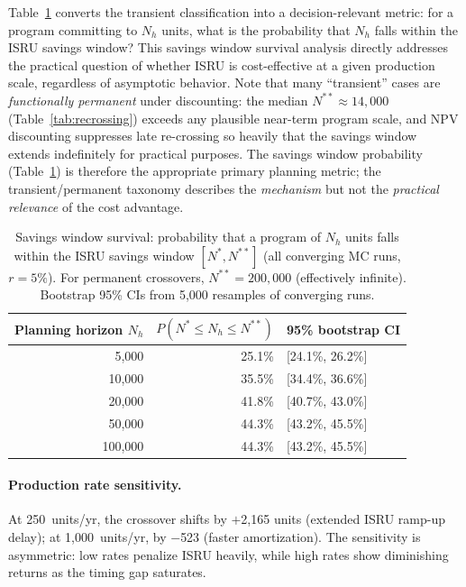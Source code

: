 \documentclass[preprint,12pt]{elsarticle}
\begin{document}
Table~\ref{tab:savings_survival} converts the transient classification into a decision-relevant metric: for a program committing to $N_h$ units, what is the probability that $N_h$ falls within the ISRU savings window? This savings window survival analysis directly addresses the practical question of whether ISRU is cost-effective at a given production scale, regardless of asymptotic behavior. Note that many ``transient'' cases are \emph{functionally permanent} under discounting: the median $N^{**} \approx 14{,}000$ (Table~\ref{tab:recrossing}) exceeds any plausible near-term program scale, and NPV discounting suppresses late re-crossing so heavily that the savings window extends indefinitely for practical purposes. The savings window probability (Table~\ref{tab:savings_survival}) is therefore the appropriate primary planning metric; the transient/permanent taxonomy describes the \emph{mechanism} but not the \emph{practical relevance} of the cost advantage.

\begin{table}[htbp]
\centering
\caption{Savings window survival: probability that a program of $N_h$ units falls within the ISRU savings window $[N^*, N^{**}]$ (all converging MC runs, $r = 5\%$). For permanent crossovers, $N^{**} = 200{,}000$ (effectively infinite). Bootstrap 95\% CIs from 5{,}000 resamples of converging runs.}
\label{tab:savings_survival}
\small
\begin{tabular}{@{}rrl@{}}
\toprule
Planning horizon $N_h$ & $P(N^* \leq N_h \leq N^{**})$ & 95\% bootstrap CI \\
\midrule
5{,}000   & 25.1\% & [24.1\%, 26.2\%] \\
10{,}000  & 35.5\% & [34.4\%, 36.6\%] \\
20{,}000  & 41.8\% & [40.7\%, 43.0\%] \\
50{,}000  & 44.3\% & [43.2\%, 45.5\%] \\
100{,}000 & 44.3\% & [43.2\%, 45.5\%] \\
\bottomrule
\end{tabular}
\end{table}

\paragraph{Production rate sensitivity.} At 250~units/yr, the crossover shifts by $+$2{,}165 units (extended ISRU ramp-up delay); at 1{,}000~units/yr, by $-$523 (faster amortization). The sensitivity is asymmetric: low rates penalize ISRU heavily, while high rates show diminishing returns as the timing gap saturates.
\end{document}
